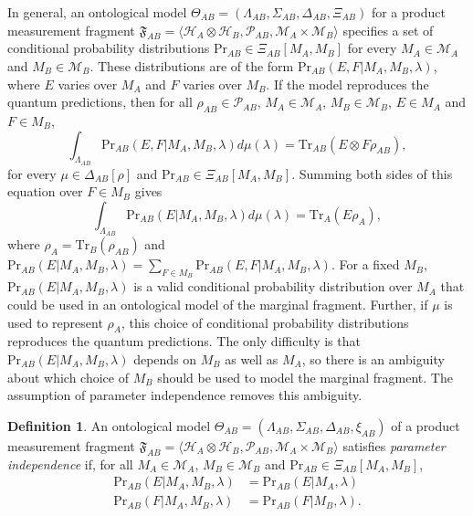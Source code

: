 \documentclass[DIV=calc,fontsize=12pt]{scrartcl} %
\theoremstyle{definition}
\newtheorem{definition}{Definition}[section]
\theoremstyle{plain}
\newcommand{\Hilb}[1][]{\ensuremath{\mathcal{H}_{#1}}}
\newcommand{\Tr}[2][]{\ensuremath{\text{Tr}_{#1} \left ( #2 \right )}}
\begin{document}
In general, an ontological model $\Theta_{AB} = (\Lambda_{AB},
\Sigma_{AB}, \Delta_{AB}, \Xi_{AB})$ for a product measurement
fragment $\mathfrak{F}_{AB} = \langle \Hilb[A] \otimes \Hilb[B],
\mathcal{P}_{AB}, \mathcal{M}_A \times \mathcal{M}_B \rangle$
specifies a set of conditional probability distributions
$\text{Pr}_{AB} \in \Xi_{AB}[M_A,\allowbreak M_B]$ for every $M_A \in
\mathcal{M}_A$ and $M_B \in \mathcal{M}_B$.  These distributions are
of the form $\text{Pr}_{AB}(E,F|M_A,M_B,\lambda)$, where $E$ varies
over $M_A$ and $F$ varies over $M_B$.  If the model reproduces the
quantum predictions, then for all $\rho_{AB} \in \mathcal{P}_{AB}$,
$M_A \in \mathcal{M}_A$, $M_B \in \mathcal{M}_B$, $E \in M_A$ and $F
\in M_B$,
\begin{equation}
\int_{\Lambda_{AB}} \text{Pr}_{AB}(E,F|M_A,M_B,\lambda)
d\mu(\lambda) = \Tr[AB]{E \otimes F \rho_{AB}},
\end{equation}
for every $\mu \in \Delta_{AB}[\rho]$ and $\text{Pr}_{AB} \in
\Xi_{AB}[M_A,M_B]$.  Summing both sides of this equation over $F \in
M_B$ gives
\begin{equation}
\label{eq:CR:margreprod}
\int_{\Lambda_{AB}} \text{Pr}_{AB}(E|M_A,M_B,\lambda) d\mu(\lambda) =
\Tr[A]{E \rho_A},
\end{equation}
where $\rho_A = \Tr[B]{\rho_{AB}}$ and
$\text{Pr}_{AB}(E|M_A,M_B,\lambda) = \sum_{F \in M_B}
\text{Pr}_{AB}(E,F|M_A,M_B,\lambda)$.  For a fixed $M_B$,
$\text{Pr}_{AB}(E|M_A,M_B,\lambda)$ is a valid conditional probability
distribution over $M_A$ that could be used in an ontological model of
the marginal fragment.  Further, if $\mu$ is used to represent
$\rho_A$, this choice of conditional probability distributions
reproduces the quantum predictions.  The only difficulty is that
$\text{Pr}_{AB}(E|M_A,M_B,\lambda)$ depends on $M_B$ as well as $M_A$,
so there is an ambiguity about which choice of $M_B$ should be used to
model the marginal fragment.  The assumption of parameter independence
removes this ambiguity.

\begin{definition}
An ontological model $\Theta_{AB} = (\Lambda_{AB}, \Sigma_{AB},
\Delta_{AB}, \xi_{AB})$ of a product measurement fragment
$\mathfrak{F}_{AB} = \langle \Hilb[A] \otimes \Hilb[B],
\mathcal{P}_{AB}, \mathcal{M}_A \times \mathcal{M}_B \rangle$
satisfies \emph{parameter independence} if, for all $M_A \in
\mathcal{M}_A$, $M_B \in \mathcal{M}_B$ and $\text{Pr}_{AB} \in
\Xi_{AB}[M_A,M_B]$,
\begin{align}
\text{Pr}_{AB}(E|M_A,M_B,\lambda) & =
\text{Pr}_{AB}(E|M_A,\lambda) \\
\text{Pr}_{AB}(F|M_A,M_B,\lambda) & =
\text{Pr}_{AB}(F|M_B,\lambda).
\end{align}
\end{definition}
\end{document}
